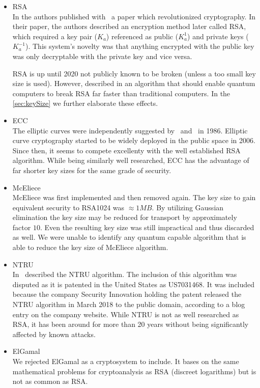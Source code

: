 \begin{itemize}
	\item RSA\\
	In \citeyear{Rivest:1978:MOD:359340.359342} the authors \citeauthor{Rivest:1978:MOD:359340.359342} published with~\cite{Rivest:1978:MOD:359340.359342} a paper which revolutionized cryptography. In their paper, the authors described an encryption method later called RSA, which required a key pair ($K_a$) referenced as public ($K^{1}_a$) and private keys ($K^{-1}_a$). This system's novelty was that anything encrypted with the public key was only decryptable with the private key and vice versa.
	
	RSA is up until 2020 not publicly known to be broken (unless a too small key size is used). 
	However, \citeauthor{Shor97polynomial-timealgorithms} described in \citeyear{Shor97polynomial-timealgorithms} an algorithm that should enable quantum computers to break RSA far faster than traditional computers. In the \cref{sec:keySize} we further elaborate these effects.
	\item ECC\\
	The elliptic curves were independently suggested by~\cite{Miller1986} and~\cite{Koblitz04guideto} in 1986. Elliptic curve cryptography started to be widely deployed in the public space in 2006. Since then, it seems to compete excellenty with the well established RSA algorithm. While being similarly well researched, ECC has the advantage of far shorter key sizes for the same grade of security.
	\item McEliece\\
	McEliece was first implemented and then removed again. The key size to gain equivalent security to RSA1024 was $\approx 1MB$. By utilizing Gaussian elimination the key size may be reduced for transport by approximately factor $10$. Even the resulting key size was still impractical and thus discarded as well. We were unable to identify any quantum capable algorithm that is able to reduce the key size of McEliece algorithm.
	\item NTRU\\
	In~\cite{Hoffstein1998} \citeauthor{Hoffstein1998} described the NTRU algorithm. The inclusion of this algorithm was disputed as it is patented in the United States as US7031468. It was included because the company Security Innovation holding the patent released the NTRU algorithm in March  2018 to the public domain, according to a blog entry on the company website. While NTRU is not as well researched as RSA, it has been around for more than 20 years without being significantly affected by known attacks.
	\item ElGamal\\
	We rejected ElGamal as a cryptosystem to include. It bases on the same mathematical problems for cryptoanalysis as RSA (discreet logarithms) but is not as common as RSA.
\end{itemize}


